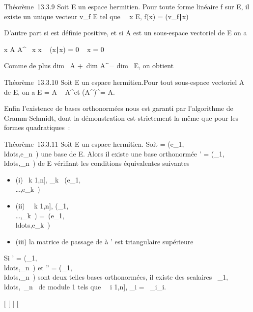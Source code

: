 \documentclass[]{article}
\begin{document}
Théorème~13.3.9 Soit E un espace hermitien. Pour toute forme linéaire f
sur E, il existe un unique vecteur v\_f \in E tel que
\forall~~x \in E, f(x) =
(v\_f∣x)

D'autre part si \Phi est définie positive, et si A est un sous-espace
vectoriel de E on a

x \in A \bigcap A^\bot\rigtharrow~ x \bot x \rigtharrow~ (x∣x) = 0 \rigtharrow~ x
= 0

Comme de plus dim~ A +\
dim A^\bot = dim~ E, on obtient

Théorème~13.3.10 Soit E un espace hermitien.Pour tout sous-espace
vectoriel A de E, on a E = A \oplus~ A^\bot et
(A^\bot)^\bot = A.

Enfin l'existence de bases orthonormées nous est garanti par
l'algorithme de Gramm-Schmidt, dont la démonstration est strictement la
même que pour les formes quadratiques~:

Théorème~13.3.11 Soit E un espace hermitien. Soit  =
(e\_1,\\ldots,e\_n~)
une base de E. Alors il existe une base orthonormée ' =
(\epsilon\_1,\\ldots,\epsilon\_n~)
de E vérifiant les conditions équivalentes suivantes

\begin{itemize}
\itemsep1pt\parskip0pt
\item
  (i) \forall~k \in {[}1,n{]}, \epsilon\_k~
  \in\mathrmVect(e\_1,\\\ldots,e\_k~)
\item
  (ii) \forall~~k \in {[}1,n{]},
  \mathrmVect(\epsilon\_1,\\\ldots,\epsilon\_k~)
  =\
  \mathrmVect(e\_1,\\ldots,e\_k~)
\item
  (iii) la matrice de passage de  à ' est triangulaire supérieure
\end{itemize}

Si ' =
(\epsilon\_1,\\ldots,\epsilon\_n~)
et \mathcal{E}'' =
(\eta\_1,\\ldots,\eta\_n~)
sont deux telles bases orthonormées, il existe des scalaires
\lambda~\_1,\\ldots,\lambda~\_n~
de module 1 tels que \forall~~i \in {[}1,n{]},
\eta\_i = \lambda~\_i\epsilon\_i.

{[}
{[}
{[}
{[}
\end{document}
